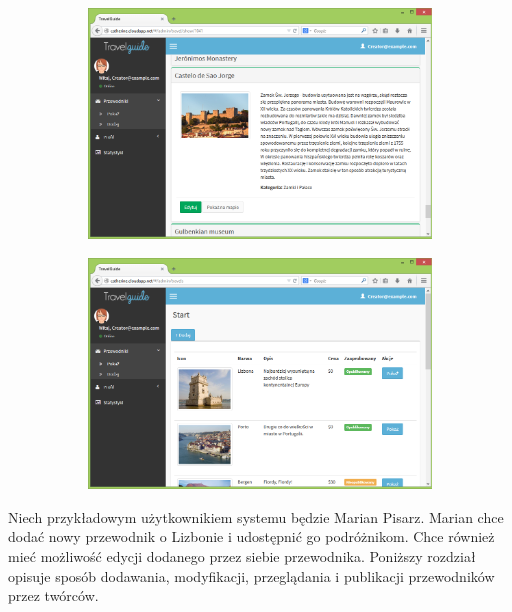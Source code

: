 \documentclass[a4paper]{book}
\begin{document}
		\begin{figure}[H]
			\ContinuedFloat
			
			\begin{subfigure}{1\textwidth}
				\includegraphics[width=\textwidth]{screenshots/web/9edycja3.png}
				\caption{\label{subfig:web_edit3}}	
			\end{subfigure}
			\hfill
			\begin{subfigure}{1\textwidth}
				\includegraphics[width=\textwidth]{screenshots/web/10wszystkie.png}
				\caption{\label{subfig:web_all}}	
			\end{subfigure}
		\end{figure}
		
		Niech przykładowym użytkownikiem systemu będzie Marian Pisarz. Marian chce dodać nowy przewodnik o Lizbonie i udostępnić go podróżnikom. Chce również mieć możliwość edycji dodanego przez siebie przewodnika. Poniższy rozdział opisuje sposób dodawania, modyfikacji, przeglądania i publikacji przewodników przez twórców.
		
\end{document}
